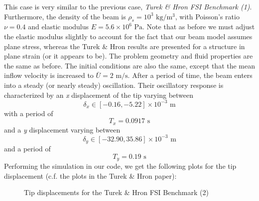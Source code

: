 \documentclass{article}
\begin{document}
\begin{enumerate}
This case is very similar to the previous case, \emph{Turek \& Hron FSI Benchmark (1)}.
Furthermore, the density of the beam is $\rho_s = 10^3 \mbox{ kg/m$^3$}$, with Poisson's ratio $\nu = 0.4$ and elastic modulus $E = 5.6 \times 10^6 \mbox{ Pa}$.  
Note that as before we must adjust the elastic modulus slightly to account for the fact that our beam model assumes plane stress, whereas the Turek \& Hron results are presented for a structure in plane strain (or it appears to be).
The problem geometry and fluid properties are the same as before.  
The initial conditions are also the same, except that the mean inflow velocity is increased to $\bar{U} = 2 \mbox{ m/s}$.
After a period of time, the beam enters into a steady (or nearly steady) oscillation.  
Their oscillatory response is characterized by an \emph{x} displacement of the tip varying between
\[ \delta_x \in [-0.16,-5.22] \times 10^{-3} \mbox{ m} \]
with a period of
\[ T_x = 0.0917 \mbox{ s} \]
and a \emph{y} displacement varying between
\[ \delta_y \in [-32.90,35.86] \times 10^{-3} \mbox{ m} \]
and a period of
\[ T_y = 0.19 \mbox{ s} \]
Performing the simulation in our code, we get the following plots for the tip displacement (c.f. the plots in the Turek \& Hron paper):
\begin{figure}[ht]
        \centering
        \caption{Tip displacements for the Turek \& Hron FSI Benchmark (2)}
\end{figure}


\end{enumerate}
\end{document}
